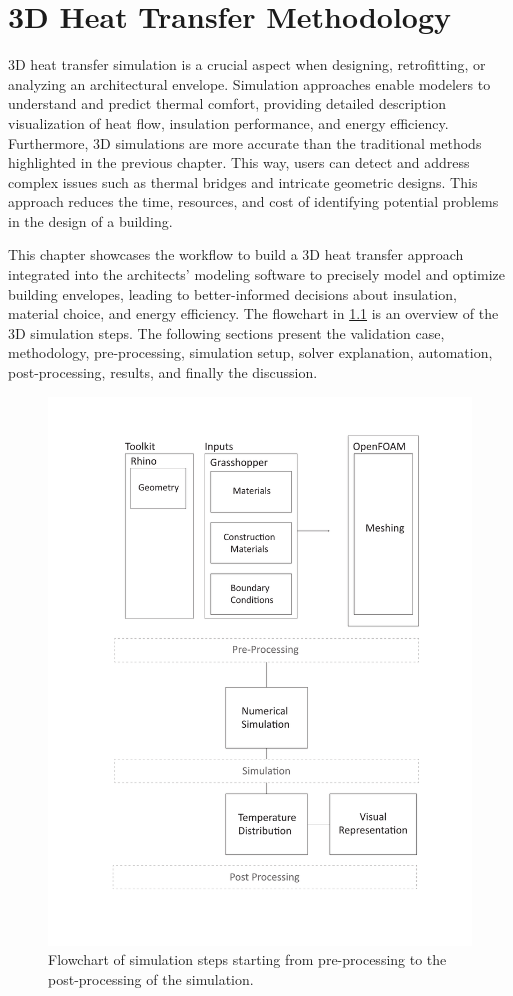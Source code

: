 
\chapter{3D Heat Transfer Methodology}

3D heat transfer simulation is a crucial aspect when designing, retrofitting, or analyzing an architectural envelope.
Simulation approaches enable modelers to understand and predict thermal comfort, providing detailed description visualization of heat flow, insulation performance, and energy efficiency. 
Furthermore, 3D simulations are more accurate than the traditional methods highlighted in the previous chapter. 
This way, users can detect and address complex issues such as thermal bridges and intricate geometric designs. 
This approach reduces the time, resources, and cost of identifying potential problems in the design of a building. 
 
This chapter showcases the workflow to build a 3D heat transfer approach integrated into the architects' modeling software to precisely model and optimize building envelopes, leading to better-informed decisions about insulation, material choice, and energy efficiency. The flowchart in \ref{fig:flowchart} is an overview of the 3D simulation steps. The following sections present the validation case, methodology, pre-processing, simulation setup, solver explanation, automation, post-processing, results, and finally the discussion. 






   
\begin{figure}[h!]
     \centering
    \includegraphics[trim=2.7cm 1.7cm 2.7cm 1.5cm, clip, width=0.7\linewidth]{Figures/flowchartv.pdf}
     \caption[Simulation Flowchart]{Flowchart of simulation steps starting from pre-processing to the post-processing of the simulation.}
   \label{fig:flowchart}
 \end{figure}



